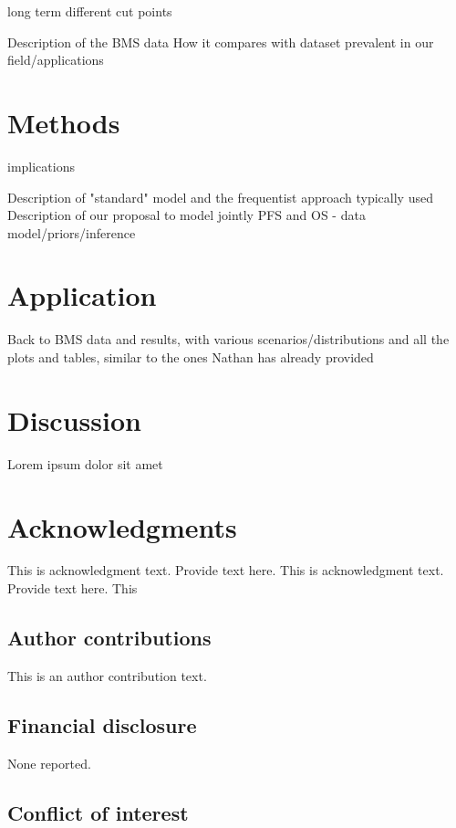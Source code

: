 \documentclass[AMA,STIX1COL]{WileyNJD-v2}
\begin{document}
long term
different cut points

Description of the BMS data
How it compares with dataset prevalent in our field/applications


\section{Methods}\label{sec5}

implications

Description of "standard" model and the frequentist approach typically used
Description of our proposal to model jointly PFS and OS - data model/priors/inference


\section{Application}\label{sec5}

Back to BMS data and results, with various scenarios/distributions and all the plots and tables, similar to the ones Nathan has already provided


\section{Discussion}\label{sec5}

Lorem ipsum dolor sit amet


\section*{Acknowledgments}
This is acknowledgment text.\cite{Kenamond2013} Provide text here. This is acknowledgment text. Provide text here. This 
\subsection*{Author contributions}

This is an author contribution text.

\subsection*{Financial disclosure}

None reported.

\subsection*{Conflict of interest}
\end{document}
